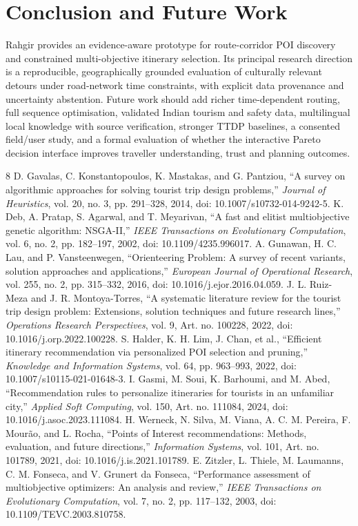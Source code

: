 \documentclass[10pt,conference]{IEEEtran}
\begin{document}
\section{Conclusion and Future Work}
Rahgir provides an evidence-aware prototype for route-corridor POI discovery and constrained multi-objective itinerary selection. Its principal research direction is a reproducible, geographically grounded evaluation of culturally relevant detours under road-network time constraints, with explicit data provenance and uncertainty abstention. Future work should add richer time-dependent routing, full sequence optimisation, validated Indian tourism and safety data, multilingual local knowledge with source verification, stronger TTDP baselines, a consented field/user study, and a formal evaluation of whether the interactive Pareto decision interface improves traveller understanding, trust and planning outcomes.

\begin{thebibliography}{8}
 D. Gavalas, C. Konstantopoulos, K. Mastakas, and G. Pantziou, ``A survey on algorithmic approaches for solving tourist trip design problems,'' \emph{Journal of Heuristics}, vol. 20, no. 3, pp. 291--328, 2014, doi: 10.1007/s10732-014-9242-5.
 K. Deb, A. Pratap, S. Agarwal, and T. Meyarivan, ``A fast and elitist multiobjective genetic algorithm: NSGA-II,'' \emph{IEEE Transactions on Evolutionary Computation}, vol. 6, no. 2, pp. 182--197, 2002, doi: 10.1109/4235.996017.
 A. Gunawan, H. C. Lau, and P. Vansteenwegen, ``Orienteering Problem: A survey of recent variants, solution approaches and applications,'' \emph{European Journal of Operational Research}, vol. 255, no. 2, pp. 315--332, 2016, doi: 10.1016/j.ejor.2016.04.059.
 J. L. Ruiz-Meza and J. R. Montoya-Torres, ``A systematic literature review for the tourist trip design problem: Extensions, solution techniques and future research lines,'' \emph{Operations Research Perspectives}, vol. 9, Art. no. 100228, 2022, doi: 10.1016/j.orp.2022.100228.
 S. Halder, K. H. Lim, J. Chan, et al., ``Efficient itinerary recommendation via personalized POI selection and pruning,'' \emph{Knowledge and Information Systems}, vol. 64, pp. 963--993, 2022, doi: 10.1007/s10115-021-01648-3.
 I. Gasmi, M. Soui, K. Barhoumi, and M. Abed, ``Recommendation rules to personalize itineraries for tourists in an unfamiliar city,'' \emph{Applied Soft Computing}, vol. 150, Art. no. 111084, 2024, doi: 10.1016/j.asoc.2023.111084.
 H. Werneck, N. Silva, M. Viana, A. C. M. Pereira, F. Mour\~ao, and L. Rocha, ``Points of Interest recommendations: Methods, evaluation, and future directions,'' \emph{Information Systems}, vol. 101, Art. no. 101789, 2021, doi: 10.1016/j.is.2021.101789.
 E. Zitzler, L. Thiele, M. Laumanns, C. M. Fonseca, and V. Grunert da Fonseca, ``Performance assessment of multiobjective optimizers: An analysis and review,'' \emph{IEEE Transactions on Evolutionary Computation}, vol. 7, no. 2, pp. 117--132, 2003, doi: 10.1109/TEVC.2003.810758.
\end{thebibliography}
\end{document}

